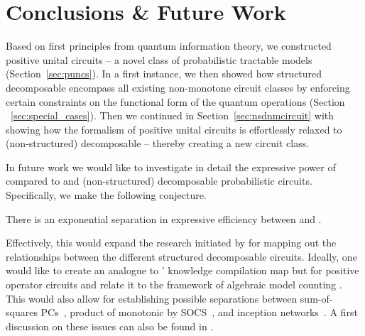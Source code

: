 \section{Conclusions \& Future Work}
\label{sec:conclusions}

Based on first principles from quantum information theory, we constructed positive unital circuits -- a novel class of probabilistic tractable models (Section~\ref{sec:puncs}).
In a first instance, we then showed how structured decomposable \puncs encompass all existing non-monotone circuit classes by enforcing certain constraints on the functional form of the quantum operations (Section ~\ref{sec:special_cases}).
Then we continued in Section~\ref{sec:nsdnmcircuit} with showing how the formalism of
positive unital circuits is effortlessly relaxed to (non-structured) decomposable \puncs -- thereby creating a new circuit class.

In future work we would like to investigate in detail the expressive power of \dpuncs compared to \sdpuncs and (non-structured) decomposable probabilistic circuits. Specifically, we make the following conjecture.

\begin{conjecture}
	There is an exponential separation in expressive efficiency between \dpuncs and \sdpuncs.
\end{conjecture}

Effectively, this would expand the research initiated by \citet{loconte2024subtractive} for mapping out the relationships between the different structured decomposable circuits. Ideally, one would like to create an analogue to \citeauthor{darwiche2002knowledge}' knowledge compilation map \citep{darwiche2002knowledge} but for positive operator circuits and relate it to the framework of algebraic model counting \citep{kimmig2017algebraic}.
This would also allow for establishing possible separations between sum-of-squares PCs~\citep{loconte2024subtractive}, product of monotonic by SOCS~\citep[Definition 5]{loconte2024subtractive}, and inception networks~\citep{wangrelationship}.
A first discussion on these issues can also be found in \citep[Appendix A]{wangrelationship}.




